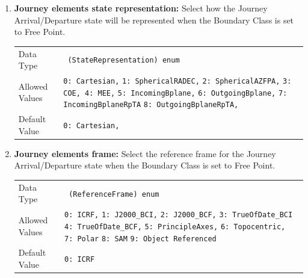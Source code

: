 \begin{enumerate}
    \item \textbf{Journey elements state representation:} Select how the Journey Arrival/Departure state will be represented when the Boundary Class is set to Free Point.
    
    
    \begin{table}[H]
        \hspace{2cm}
        \begin{tabular}{lp{3cm}}
        Data Type & \verb| (StateRepresentation) enum| \\ 
        Allowed Values & \verb|0: Cartesian,| \newline 
            \verb|1: SphericalRADEC,| \newline 
            \verb|2: SphericalAZFPA,| \newline 
            \verb|3: COE, 4: MEE,| \newline 
            \verb|5: IncomingBplane,| \newline
            \verb|6: OutgoingBplane,|\newline
            \verb|7: IncomingBplaneRpTA|\newline
            \verb|8: OutgoingBplaneRpTA,| \\
        Default Value & \verb|0: Cartesian, | \\
        \end{tabular}
    \end{table}

    \item \textbf{Journey elements frame:} Select the reference frame for the Journey Arrival/Departure state when the Boundary Class is set to Free Point.

        \begin{table}[H]
            \hspace{2cm}
            \begin{tabular}{lp{3cm}}
            Data Type & \verb| (ReferenceFrame) enum| \\
            Allowed Values & \verb|0: ICRF,| \newline 
            \verb|1: J2000_BCI,| \newline 
            \verb|2: J2000_BCF,| \newline 
            \verb|3: TrueOfDate_BCI| \newline 
            \verb|4: TrueOfDate_BCF,| \newline 
            \verb|5: PrincipleAxes,| \newline
            \verb|6: Topocentric, |\newline
            \verb|7: Polar|\newline
            \verb|8: SAM|\newline
            \verb|9: Object Referenced|\\
            Default Value & \verb|0: ICRF |\\
            \end{tabular}
        \end{table}


\end{enumerate}
